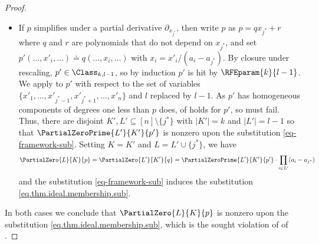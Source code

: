 \begin{proof}
\begin{itemize}
      This means that  does not hold for $p'$.
      Thus, there must be disjoint $K',L' \subseteq [n]\setminus\{j^*\}$
      with $|K'|=k-1$ and $|L'|=l$ so that $\PartialZeroPrime{L'}{K'}{p'}$ is nonzero upon the substitution
      \begin{equation}\label{eq-framework-sub}
        x'_i \gets z\cdot \frac%
          { \prod_{j \in K'} (a_i - a_{j}) }%
          { \prod_{j \in L'} (a_i - a_{j}) }.
      \end{equation}
      Setting $K = K' \cup \{j^*\}$ and $L=L'$, we have
      \[ \PartialZero{L}{K}{p} = \PartialZero{L'}{K'}{r} = \PartialZeroPrime{L'}{K'}{p'} \Big/ \prod_{i \in L'} (a_i-a_{j^*}) \]
      and the substitution \eqref{eq-framework-sub} induces the substitution \eqref{eq.thm.ideal.membership.sub}.
      \item
      If $p$ simplifies under a partial derivative
      \(\partial_{x_{j^*}}\),
      then write $p$ as $p = q x_{j^*} + r$ where $q$ and $r$ are polynomials that do not depend on $x_{j^*}$,
      and set
      $p'(\dots, x'_i, \dots) \doteq q(\dots, x_i, \dots)$ with $x_i=x'_i / (a_i-a_{j^*})$. By closure under rescaling, $p'\in \Class_{k,l-1}$, so by induction $p'$ is hit by \(\RFEparam{k}{l-1}\).
      We apply  to $p'$ with respect to the set of
      variables \(\{x'_1,\ldots,x'_{j^*-1},x'_{j^*+1},\ldots,x'_n\}\) and $l$ replaced by $l-1$.
      As $p'$ has homogeneous components of degrees one less than $p$ does,
       of
       holds for $p'$, so  must fail. Thus, 
      there are disjoint $K',L' \subseteq [n]\setminus\{j^*\}$ with
      $|K'|=k$ and $|L'|=l-1$ so that $\PartialZeroPrime{L'}{K'}{p'}$ is nonzero upon the substitution
      \eqref{eq-framework-sub}.
      Setting $K = K'$ and $L=L' \cup \{j^*\}$, we have 
      \[ \PartialZero{L}{K}{p} = \PartialZero{L'}{K'}{q} = \PartialZeroPrime{L'}{K'}{p'} \cdot \prod_{i \in L'} (a_i-a_{j^*}) \]
      and the substitution \eqref{eq-framework-sub} induces the substitution \eqref{eq.thm.ideal.membership.sub}. 
  \end{itemize}
  In both cases we conclude that $\PartialZero{L}{K}{p}$ is nonzero upon the substitution \eqref{eq.thm.ideal.membership.sub}, which is the sought violation of  of .
\end{proof}

